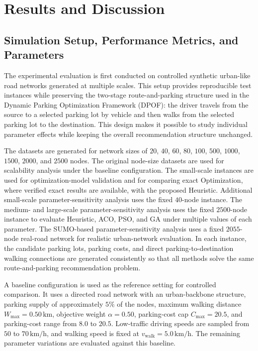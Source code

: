 \section{Results and Discussion}

\subsection{Simulation Setup, Performance Metrics, and Parameters}

The experimental evaluation is first conducted on controlled synthetic urban-like road networks generated at multiple scales. This setup provides reproducible test instances while preserving the two-stage route-and-parking structure used in the Dynamic Parking Optimization Framework (DPOF): the driver travels from the source to a selected parking lot by vehicle and then walks from the selected parking lot to the destination. This design makes it possible to study individual parameter effects while keeping the overall recommendation structure unchanged.

The datasets are generated for network sizes of \(20\), \(40\), \(60\), \(80\), \(100\), \(500\), \(1000\), \(1500\), \(2000\), and \(2500\) nodes. The original node-size datasets are used for scalability analysis under the baseline configuration. The small-scale instances are used for optimization-model validation and for comparing exact Optimization, where verified exact results are available, with the proposed Heuristic. Additional small-scale parameter-sensitivity analysis uses the fixed \(40\)-node instance. The medium- and large-scale parameter-sensitivity analysis uses the fixed \(2500\)-node instance to evaluate Heuristic, ACO, PSO, and GA under multiple values of each parameter. The SUMO-based parameter-sensitivity analysis uses a fixed \(2055\)-node real-road network for realistic urban-network evaluation. In each instance, the candidate parking lots, parking costs, and direct parking-to-destination walking connections are generated consistently so that all methods solve the same route-and-parking recommendation problem.

A baseline configuration is used as the reference setting for controlled comparison. It uses a directed road network with an urban-backbone structure, parking supply of approximately \(5\%\) of the nodes, maximum walking distance \(W_{\max}=0.50\,\mathrm{km}\), objective weight \(\alpha=0.50\), parking-cost cap \(C_{\max}=20.5\), and parking-cost range from \(8.0\) to \(20.5\). Low-traffic driving speeds are sampled from \(50\) to \(70\,\mathrm{km/h}\), and walking speed is fixed at \(v_{\mathrm{walk}}=5.0\,\mathrm{km/h}\). The remaining parameter variations are evaluated against this baseline.

